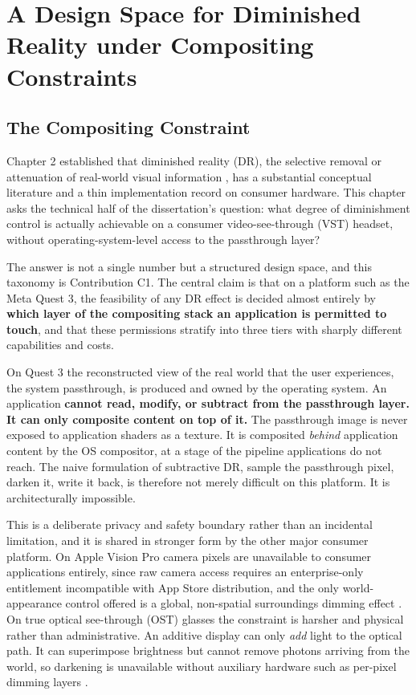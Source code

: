 \chapter{A Design Space for Diminished Reality under Compositing Constraints}

\section{The Compositing Constraint}

Chapter 2 established that diminished reality (DR), the selective removal or attenuation of
real-world visual information \citep{mori2017}, has a substantial conceptual literature and a thin
implementation record on consumer hardware. This chapter asks the technical half of the
dissertation's question: what degree of diminishment control is actually achievable on a consumer
video-see-through (VST) headset, without operating-system-level access to the passthrough layer?

The answer is not a single number but a structured design space, and this taxonomy is Contribution
C1. The central claim is that on a platform such as the Meta Quest 3, the feasibility of any DR
effect is decided almost entirely by \textbf{which layer of the compositing stack an application is
permitted to touch}, and that these permissions stratify into three tiers with sharply different
capabilities and costs.

On Quest 3 the reconstructed view of the real world that the user experiences, the system
passthrough, is produced and owned by the operating system. An application \textbf{cannot read,
modify, or subtract from the passthrough layer. It can only composite content on top of it.} The
passthrough image is never exposed to application shaders as a texture. It is composited
\textit{behind} application content by the OS compositor, at a stage of the pipeline applications do
not reach. The naive formulation of subtractive DR, sample the passthrough pixel, darken it, write it
back, is therefore not merely difficult on this platform. It is architecturally impossible.

This is a deliberate privacy and safety boundary rather than an incidental limitation, and it is
shared in stronger form by the other major consumer platform. On Apple Vision Pro camera pixels are
unavailable to consumer applications entirely, since raw camera access requires an enterprise-only
entitlement incompatible with App Store distribution, and the only world-appearance control offered
is a global, non-spatial surroundings dimming effect \citep{apple2024}. On true optical see-through
(OST) glasses the constraint is harsher and physical rather than administrative. An additive display
can only \textit{add} light to the optical path. It can superimpose brightness but cannot remove
photons arriving from the world, so darkening is unavailable without auxiliary hardware such as
per-pixel dimming layers \citep{itoh2021}.

